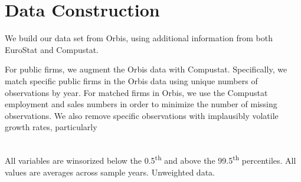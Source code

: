 \documentclass[12pt,notitlepage]{article}
\begin{document}



\FloatBarrier
\section{Data Construction} %
\label{sec:Data_Construction}
\FloatBarrier

We build our data set from Orbis, using additional information from both EuroStat and Compustat. 



For public firms, we augment the Orbis data with Compustat. Specifically, we match specific public firms in the Orbis data using unique numbers of observations by year. For matched firms in Orbis, we use the Compustat employment and sales numbers in order to minimize the number of missing observations. We also remove specific observations with implausibly volatile growth rates, particularly 




\begin{table}[!htpb]
\caption{Unweighted French Summary Statistics}
\tabularnewline \\
All variables are winsorized below the 0.5\textsuperscript{th} and above the 99.5\textsuperscript{th} percentiles. All values are averages across sample years. Unweighted data. 
\end{table}
\end{document}
